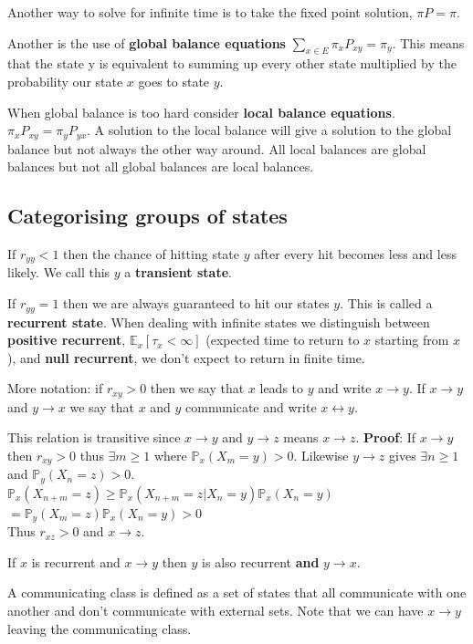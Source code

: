 \documentclass[10pt,landscape,a4paper]{article}
\begin{document}
\begin{multicols*}{4}
Another way to solve for infinite time is to take the fixed point solution,
$\pi P = \pi$.

Another is the use of \textbf{global balance equations}
$\sum_{x \in E} \pi_x P_{xy} = \pi_y$. This means that the state y is
equivalent to summing up every other state multiplied by the probability
our state $x$ goes to state $y$.

When global balance is too hard consider \textbf{local balance equations}.
$\pi_x P_{xy} = \pi_y P_{yx}$. A solution to the local balance will give a
solution to the global balance but not always the other way around. All local
balances are global balances but not all global balances are local balances.

\subsection{Categorising groups of states}
If $r_{yy} < 1$ then the chance of hitting state $y$ after every hit becomes
less and less likely. We call this $y$ a \textbf{transient state}.

If $r_{yy} = 1$ then we are always guaranteed to hit our states $y$. This is
called a \textbf{recurrent state}. When dealing with infinite states we
distinguish between \textbf{positive recurrent}, $\mathbb{E}_x[\tau_x < \infty]$
(expected time to return to $x$ starting from $x$), and \textbf{null
recurrent}, we don't expect to return in finite time.

More notation: if $r_{xy} > 0$ then we say that $x$ leads to $y$ and write $x \to y$.
If $x \to y$ and $y \to x$ we say that $x$ and $y$ communicate and write
$x \leftrightarrow y$.

This relation is transitive since $x \to y$ and $y \to z$ means $x \to z$.
\textbf{Proof}: If $x \to y$ then $r_{xy} > 0$ thus $\exists m \geq 1$ where
$\mathbb{P}_x(X_m = y) > 0$.
Likewise $y \to z$ gives $\exists n \geq 1$ and $\mathbb{P}_y(X_n = z) > 0$. \\
$\mathbb{P}_x(X_{n+m} = z) \geq \mathbb{P}_x(X_{n+m} = z | X_n = y) \mathbb{P}_x(X_n = y)$ \\
$= \mathbb{P}_y(X_{m} = z) \mathbb{P}_x(X_n = y) > 0$ \\
Thus $r_{xz} > 0$ and $x \to z$.

If $x$ is recurrent and $x \to y$ then $y$ is also recurrent \textbf{and} $y \to x$.

A communicating class is defined as a set of states that all communicate
with one another and don't communicate with external sets. Note that we
can have $x \to y$ leaving the communicating class.


\end{multicols*}
\end{document}
